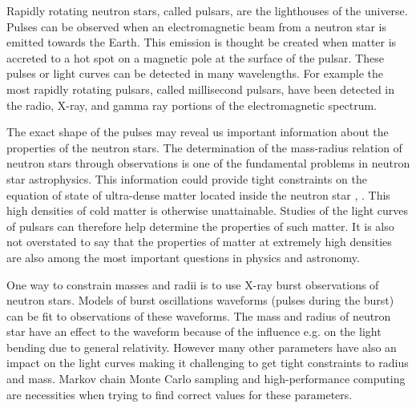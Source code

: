 \documentclass{wihuri}
\begin{document}
Rapidly rotating neutron stars, called pulsars, are the lighthouses of the universe. Pulses can be observed when an electromagnetic beam from a neutron star is emitted towards the Earth.  This emission is thought be created when matter is accreted to a hot spot on a magnetic pole at the surface of the pulsar. These pulses or light curves can be detected in many wavelengths. For example the most rapidly rotating pulsars, called millisecond pulsars, have been detected in the radio, X-ray, and gamma ray portions of the electromagnetic spectrum.

The exact shape of the pulses may reveal us important information about the properties of the neutron stars. The determination of the mass-radius relation of neutron stars through observations is one of the fundamental problems in neutron star astrophysics. This information could provide tight constraints on the equation of state of ultra-dense matter located inside the neutron star \cite{lattimer2007}, \cite{hebeler}. This high densities of cold matter is otherwise unattainable. Studies of the light curves of pulsars can therefore help determine the properties of such matter. It is also not overstated to say that the properties of matter at extremely high densities are also among the most important questions in physics and astronomy. 


One way to constrain masses and radii is to use X-ray burst observations of neutron stars. Models of burst oscillations waveforms (pulses during the burst) can be fit to observations of these waveforms. The mass and radius of neutron star have an effect to the waveform because of the influence e.g. on the light bending due to general relativity. However many other parameters have also an impact on the light curves making it challenging to get tight constraints to radius and mass. Markov chain Monte Carlo sampling and high-performance computing are necessities when trying to find correct values for these parameters. 








\vspace{10cm}











\iffalse 
\end{document}
